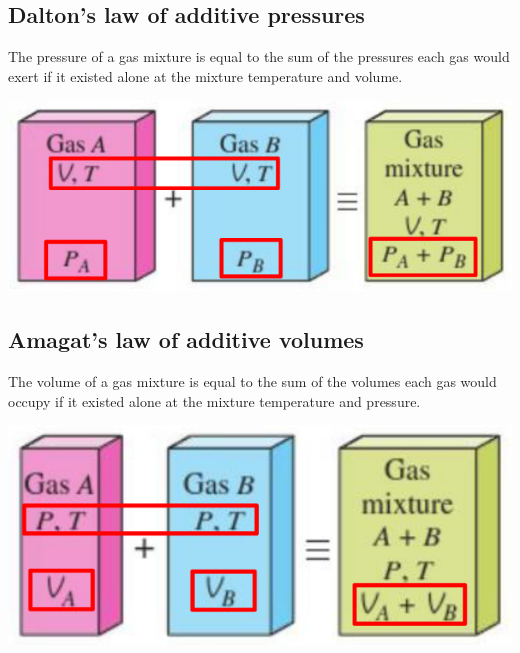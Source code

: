 \documentclass[11pt]{article}
\begin{document}
\subsection{Dalton's law of additive pressures}
\label{sec:org3650c60}
The pressure of a gas mixture is equal to the sum of the pressures each gas would exert if it existed alone at the mixture temperature and volume.

\begin{center}
\includegraphics[width=.9\linewidth]{./images/daltons-law-of-additive-pressures.png}
\end{center}

\subsection{Amagat's law of additive volumes}
\label{sec:org334df83}
The volume of a gas mixture is equal to the sum of the volumes each gas would occupy if it existed alone at the mixture temperature and pressure.

\begin{center}
\includegraphics[width=.9\linewidth]{./images/amagats-law-of-additive-volumes.png}
\end{center}

 \newpage
\end{document}
